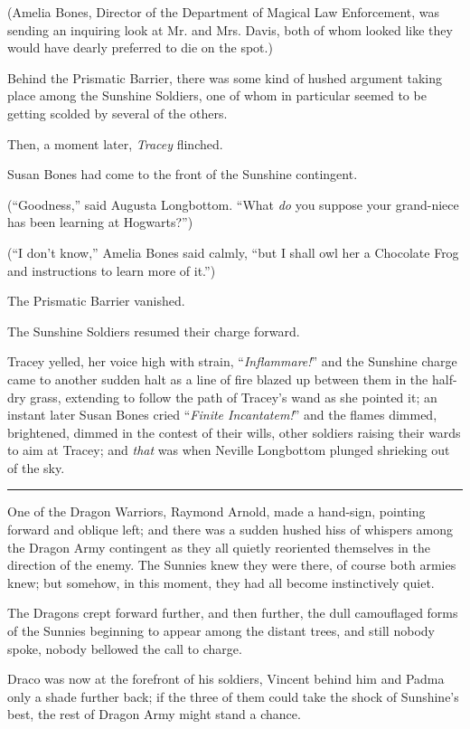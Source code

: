 (Amelia Bones, Director of the Department of Magical Law Enforcement, was sending an inquiring look at Mr. and Mrs. Davis, both of whom looked like they would have dearly preferred to die on the spot.)

Behind the Prismatic Barrier, there was some kind of hushed argument taking place among the Sunshine Soldiers, one of whom in particular seemed to be getting scolded by several of the others.

Then, a moment later, \emph{Tracey} flinched.

Susan Bones had come to the front of the Sunshine contingent.

(``Goodness,'' said Augusta Longbottom. ``What \emph{do} you suppose your grand-niece has been learning at Hogwarts?'')

(``I don't know,'' Amelia Bones said calmly, ``but I shall owl her a Chocolate Frog and instructions to learn more of it.'')

The Prismatic Barrier vanished.

The Sunshine Soldiers resumed their charge forward.

Tracey yelled, her voice high with strain, ``\emph{Inflammare!}'' and the Sunshine charge came to another sudden halt as a line of fire blazed up between them in the half-dry grass, extending to follow the path of Tracey's wand as she pointed it; an instant later Susan Bones cried ``\emph{Finite Incantatem!}'' and the flames dimmed, brightened, dimmed in the contest of their wills, other soldiers raising their wards to aim at Tracey; and \emph{that} was when Neville Longbottom plunged shrieking out of the sky.

\begin{center}\rule{3in}{0.4pt}\end{center}

One of the Dragon Warriors, Raymond Arnold, made a hand-sign, pointing forward and oblique left; and there was a sudden hushed hiss of whispers among the Dragon Army contingent as they all quietly reoriented themselves in the direction of the enemy. The Sunnies knew they were there, of course both armies knew; but somehow, in this moment, they had all become instinctively quiet.

The Dragons crept forward further, and then further, the dull camouflaged forms of the Sunnies beginning to appear among the distant trees, and still nobody spoke, nobody bellowed the call to charge.

Draco was now at the forefront of his soldiers, Vincent behind him and Padma only a shade further back; if the three of them could take the shock of Sunshine's best, the rest of Dragon Army might stand a chance.

